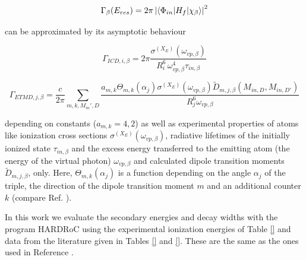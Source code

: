 \begin{equation}
 \Gamma_{\beta}(E_{res}) = 2\pi \left|
                           \braket{\Phi_{in}| H_f |\chi_{\beta}}
                           \right|^2
\end{equation}

can be approximated by its asymptotic behaviour

\begin{equation}
 \Gamma_{ICD,i,\beta} = 2\pi
                        \frac{\sigma^{(X_E)}(\omega_{vp,\beta})}
                        {R_i^6 \, \omega_{vp,\beta}^4 \tau_{in,\beta}}
\end{equation}


\begin{equation}
 \Gamma_{ETMD,j,\beta} = \frac{c}{2\pi} \sum\limits_{m,k,M_{in}',D}
                        \frac{a_{m,k} \Theta_{m,k}(\alpha_j) \sigma^{(X_E)}(\omega_{vp,\beta})
                              \tilde{D}_{m,j,\beta}(M_{in,D},M_{in,D'})}
                         {R_j^6 \omega_{vp,\beta}}
\end{equation}

depending on constants ($a_{m,k}=4,2$)
as well as experimental properties
of atoms like ionization cross sections
$\sigma^{(X_E)}(\omega_{vp,\beta})$, radiative lifetimes of the initially
ionized state $\tau_{in,\beta}$ and the excess energy transferred to the
emitting atom (the energy of the virtual photon) $\omega_{vp,\beta}$
and calculated dipole transition moments $\tilde{D}_{m,j,\beta}$, only.
Here, $\Theta_{m,k}(\alpha_j)$ is a function depending on the angle $\alpha_j$
of the triple, the direction of the dipole
transition moment $m$ and an additional counter $k$
(compare Ref. \cite{Fasshauer13}).

In this work we evaluate the secondary energies and decay widths with
the program HARDRoC \cite{HARDRoC,fasshauer2014} using the
experimental ionization energies of Table \ref{}
and data from the literature given in Tables \ref{} and \ref{}.
These are the same as the ones used in Reference \cite{Fasshauer13}.
